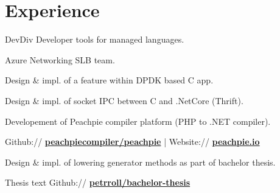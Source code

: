 \documentclass[a4paper]{deedy-resume} %
\begin{document}
\hfill
%
%
\begin{minipage}[t]{0.62\textwidth} %


\section{Experience}


\vspace{\topsep} %
\begin{tightitemize}
\item DevDiv Developer tools for managed languages.
\end{tightitemize}

\begin{tightitemize}
\item Azure Networking SLB team.
\item Design \& impl. of a feature within DPDK based C app.
\item Design \& impl. of socket IPC between C and .NetCore (Thrift).
\end{tightitemize}

\sectionspace %



\begin{tightitemize}
\item Developement of Peachpie compiler platform (PHP to .NET compiler).
\item Github:// \href{https://github.com/peachpiecompiler/peachpie}{\bf peachpiecompiler/peachpie} | Website:// \href{https://www.peachpie.io/}{\bf peachpie.io}
\item Design \& impl. of lowering generator methods as part of bachelor thesis.
\item Thesis text Github:// \href{https://github.com/petrroll/bachelor-thesis}{\bf petrroll/bachelor-thesis}
\end{tightitemize}


\end{minipage}
\end{document}
